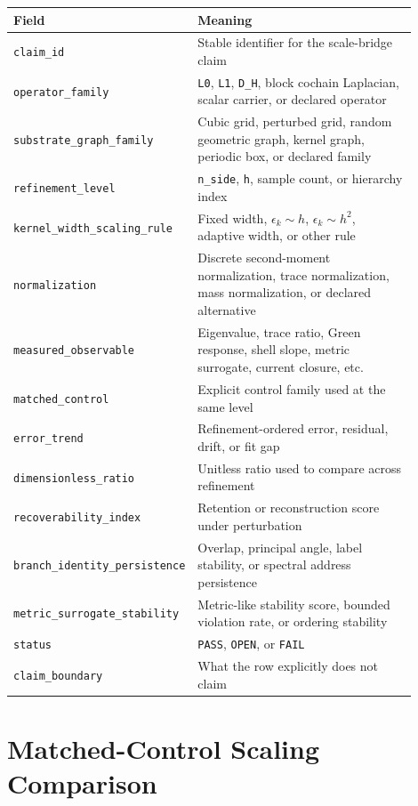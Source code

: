 \documentclass[11pt]{article}
\begin{document}
\begin{longtable}{p{0.27\linewidth}p{0.63\linewidth}}
\toprule
Field & Meaning \\
\midrule
\texttt{claim\_id} & Stable identifier for the scale-bridge claim \\
\texttt{operator\_family} & \texttt{L0}, \texttt{L1}, \texttt{D\_H}, block cochain Laplacian, scalar carrier, or declared operator \\
\texttt{substrate\_graph\_family} & Cubic grid, perturbed grid, random geometric graph, kernel graph, periodic box, or declared family \\
\texttt{refinement\_level} & \texttt{n\_side}, \texttt{h}, sample count, or hierarchy index \\
\texttt{kernel\_width\_scaling\_rule} & Fixed width, \(\epsilon_k \sim h\), \(\epsilon_k \sim h^2\), adaptive width, or other rule \\
\texttt{normalization} & Discrete second-moment normalization, trace normalization, mass normalization, or declared alternative \\
\texttt{measured\_observable} & Eigenvalue, trace ratio, Green response, shell slope, metric surrogate, current closure, etc. \\
\texttt{matched\_control} & Explicit control family used at the same level \\
\texttt{error\_trend} & Refinement-ordered error, residual, drift, or fit gap \\
\texttt{dimensionless\_ratio} & Unitless ratio used to compare across refinement \\
\texttt{recoverability\_index} & Retention or reconstruction score under perturbation \\
\texttt{branch\_identity\_persistence} & Overlap, principal angle, label stability, or spectral address persistence \\
\texttt{metric\_surrogate\_stability} & Metric-like stability score, bounded violation rate, or ordering stability \\
\texttt{status} & \texttt{PASS}, \texttt{OPEN}, or \texttt{FAIL} \\
\texttt{claim\_boundary} & What the row explicitly does not claim \\
\bottomrule
\end{longtable}

\section{Matched-Control Scaling Comparison}
\end{document}
